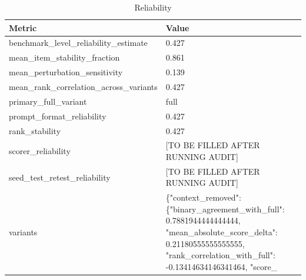 \begin{table}[t]
\centering
\caption{Reliability}
\begin{tabular}{ll}
\toprule
Metric & Value \\
\midrule
benchmark\_level\_reliability\_estimate & 0.427 \\
mean\_item\_stability\_fraction & 0.861 \\
mean\_perturbation\_sensitivity & 0.139 \\
mean\_rank\_correlation\_across\_variants & 0.427 \\
primary\_full\_variant & full \\
prompt\_format\_reliability & 0.427 \\
rank\_stability & 0.427 \\
scorer\_reliability & [TO BE FILLED AFTER RUNNING AUDIT] \\
seed\_test\_retest\_reliability & [TO BE FILLED AFTER RUNNING AUDIT] \\
variants & \{"context\_removed": \{"binary\_agreement\_with\_full": 0.7881944444444444, "mean\_absolute\_score\_delta": 0.21180555555555555, "rank\_correlation\_with\_full": -0.13414634146341464, "score\_ \\
\bottomrule
\end{tabular}
\end{table}

